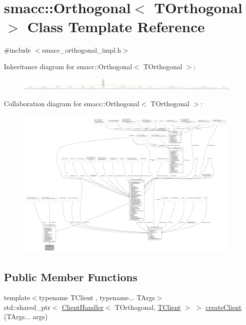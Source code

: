 \hypertarget{classsmacc_1_1Orthogonal}{}\section{smacc\+:\+:Orthogonal$<$ T\+Orthogonal $>$ Class Template Reference}
\label{classsmacc_1_1Orthogonal}


{\ttfamily \#include $<$smacc\+\_\+orthogonal\+\_\+impl.\+h$>$}



Inheritance diagram for smacc\+:\+:Orthogonal$<$ T\+Orthogonal $>$\+:
\nopagebreak
\begin{figure}[H]
\begin{center}
\leavevmode
\includegraphics[width=350pt]{classsmacc_1_1Orthogonal__inherit__graph}
\end{center}
\end{figure}


Collaboration diagram for smacc\+:\+:Orthogonal$<$ T\+Orthogonal $>$\+:
\nopagebreak
\begin{figure}[H]
\begin{center}
\leavevmode
\includegraphics[width=350pt]{classsmacc_1_1Orthogonal__coll__graph}
\end{center}
\end{figure}
\subsection*{Public Member Functions}
\begin{DoxyCompactItemize}
\item 
{\footnotesize template$<$typename T\+Client , typename... T\+Args$>$ }\\std\+::shared\+\_\+ptr$<$ \hyperlink{classsmacc_1_1ClientHandler}{Client\+Handler}$<$ T\+Orthogonal, \hyperlink{classTClient}{T\+Client} $>$ $>$ \hyperlink{classsmacc_1_1Orthogonal_aea19bfe584fe9c9580784a24b4690eab}{create\+Client} (T\+Args... args)
\end{DoxyCompactItemize}
